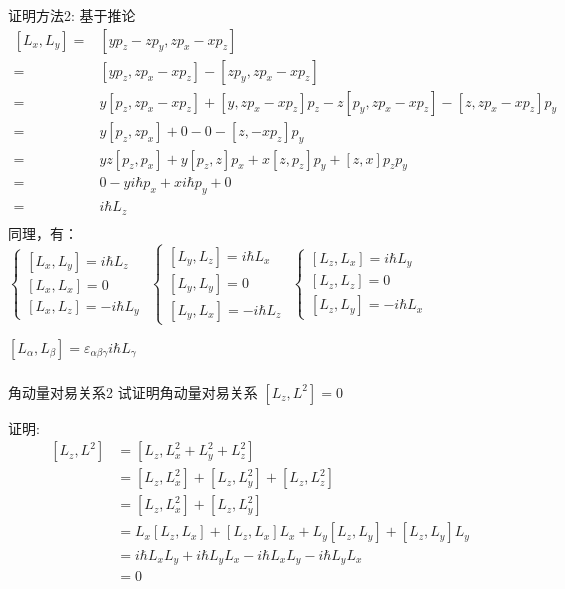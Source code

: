 \begin{frame} [allowframebreaks=]    
    \alert{证明方法2:} 基于推论 
    \begin{equation*}
        \begin{split}
        [L_x,L_y]= &[yp_z-zp_y,zp_x-xp_z]\\
        =&[yp_z,zp_x-xp_z] - [zp_y,zp_x-xp_z]\\
        =&y[p_z,zp_x-xp_z]+[y,zp_x-xp_z]p_z- z[p_y,zp_x-xp_z]-[z,zp_x-xp_z]p_y\\
        =&y[p_z,zp_x]+0- 0-[z,-xp_z]p_y\\
        =&yz[p_z,p_x]+y[p_z,z]p_x+x[z,p_z]p_y+[z,x]p_zp_y\\
        =&0-yi\hbar p_x+x i\hbar p_y+0\\
        =&i\hbar L_z\\
    \end{split}  
    \end{equation*}
    同理，有：\\
    $\begin{cases}
        [L_x,L_y]= i\hbar L_z  \\ 
        [L_x,L_x]= 0  \\ 
        [L_x,L_z]= -i\hbar L_y 
    \end{cases}$
    $\begin{cases}
        [L_y,L_z]= i\hbar L_x  \\ 
        [L_y,L_y]= 0  \\ 
        [L_y,L_x]= -i\hbar L_z 
    \end{cases}$
    $\begin{cases}
        [L_z,L_x]= i\hbar L_y  \\ 
        [L_z,L_z]= 0  \\ 
        [L_z,L_y]= -i\hbar L_x 
    \end{cases}$
    \begin{tcolorbox4}[角动量对易关系]
        $ [L_\alpha,L_\beta]= \varepsilon_{\alpha\beta\gamma} i\hbar L_\gamma $ 
    \end{tcolorbox4}
\end{frame} 

\begin{frame} [allowframebreaks=]
    \frametitle{}
    \begin{tcolorbox1}{角动量对易关系2}
        试证明角动量对易关系 $[L_z,L^2]=0$
    \end{tcolorbox1}
    \alert{证明:} 
    \begin{equation*}
        \begin{split}
        [L_z,L^2]&= [L_z,L_x ^2+L_y ^2+L_z ^2]\\
        &=[L_z,L_x ^2]+[L_z,L_y ^2]+[L_z,L_z ^2]\\
        &=[L_z,L_x ^2]+[L_z,L_y ^2]\\
        &=L_x[L_z,L_x] +[L_z,L_x]L_x +L_y[L_z,L_y] +[L_z,L_y]L_y\\
        &=i\hbar L_x L_y +i\hbar L_yL_x - i\hbar L_x L_y -i\hbar L_yL_x\\
        &=0 \\
        \end{split}  
    \end{equation*}
\end{frame} 

